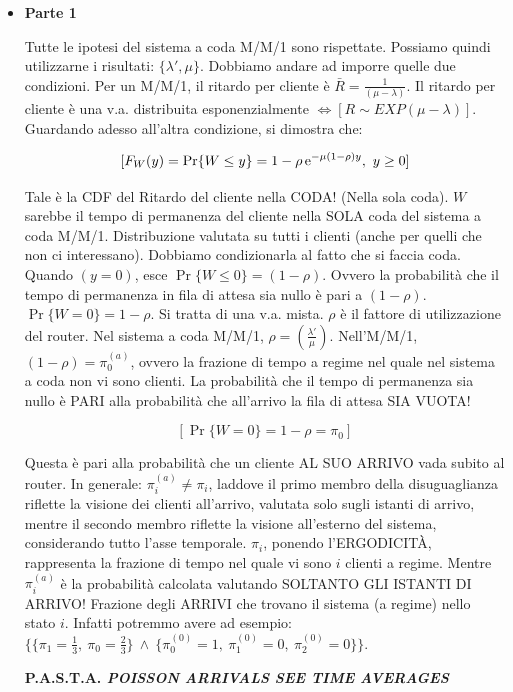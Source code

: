 \begin{itemize}

\item{\textbf{Parte 1}}

Tutte le ipotesi del sistema a coda M/M/1 sono rispettate. Possiamo quindi utilizzarne i risultati: $\{\lambda',\mu\}$. Dobbiamo andare ad imporre quelle due condizioni. Per un M/M/1, il ritardo per cliente è $\bar{R} = \frac{1}{(\mu-\lambda)}$. Il ritardo per cliente è una v.a. distribuita esponenzialmente $\iff [R \sim EXP(\mu-\lambda)]$. Guardando adesso all'altra condizione, si dimostra che:

\[
	[F_W(y) = \Pr\{W \leq y\} = 1-\rho\mathop{}\!\mathrm{e}^{-\mu(1-\rho)y},\ y\geq 0]
\]

Tale è la CDF del Ritardo del cliente nella CODA! (Nella sola coda). $W$ sarebbe il tempo di permanenza del cliente nella SOLA coda del sistema a coda M/M/1. Distribuzione valutata su tutti i clienti (anche per quelli che non ci interessano). Dobbiamo condizionarla al fatto che si faccia coda. Quando $(y=0)$, esce $\Pr\{W\leq 0\} = (1-\rho)$. Ovvero la probabilità che il tempo di permanenza in fila di attesa sia nullo è pari a $(1-\rho)$. $\Pr\{W = 0\} = 1-\rho$. Si tratta di una v.a. mista. $\rho$ è il fattore di utilizzazione del router. Nel sistema a coda M/M/1, $\rho = (\frac{\lambda'}{\mu})$. Nell'M/M/1, $(1-\rho)=\pi_0^{(a)}$, ovvero la frazione di tempo a regime nel quale nel sistema a coda non vi sono clienti. La probabilità che il tempo di permanenza sia nullo è PARI alla probabilità che all'arrivo la fila di attesa SIA VUOTA!

\[
	[\Pr\{W = 0\} = 1-\rho = \pi_0]
\]

Questa è pari alla probabilità che un cliente AL SUO ARRIVO vada subito al router. In generale: $\pi_i^{(a)} \neq \pi_i$, laddove il primo membro della disuguaglianza riflette la visione dei clienti all'arrivo, valutata solo sugli istanti di arrivo, mentre il secondo membro riflette la visione all'esterno del sistema, considerando tutto l'asse temporale. $\pi_i$, ponendo l'ERGODICIT\`A, rappresenta la frazione di tempo nel quale vi sono $i$ clienti a regime. Mentre $\pi_i^{(a)}$ è la probabilità calcolata valutando SOLTANTO GLI ISTANTI DI ARRIVO! Frazione degli ARRIVI che trovano il sistema (a regime) nello stato $i$. Infatti potremmo avere ad esempio: $\{\{\pi_1 = \frac{1}{3},\ \pi_0=\frac{2}{3}\}\ \land\ \{\pi_0^{(0)}=1,\ \pi_1^{(0)}=0,\ \pi_2^{(0)}=0\}\}$.

\begin{thrm}{\textbf{P.A.S.T.A. \textit{POISSON ARRIVALS SEE TIME AVERAGES}}}


\end{thrm}
\end{itemize}
